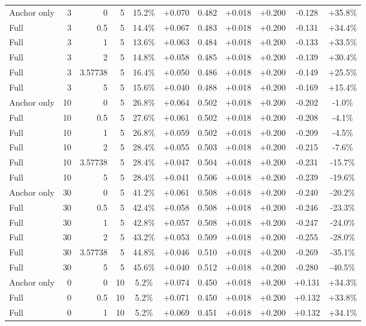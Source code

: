 \begin{table}[htbp]
\begin{tabular}{lrrrccccccc}
Anchor only & 3 & 0 & 5 & 15.2\% & +0.070 & 0.482 & +0.018 & +0.200 & -0.128 & +35.8\% \\
Full & 3 & 0.5 & 5 & 14.4\% & +0.067 & 0.483 & +0.018 & +0.200 & -0.131 & +34.4\% \\
Full & 3 & 1 & 5 & 13.6\% & +0.063 & 0.484 & +0.018 & +0.200 & -0.133 & +33.5\% \\
Full & 3 & 2 & 5 & 14.8\% & +0.058 & 0.485 & +0.018 & +0.200 & -0.139 & +30.4\% \\
Full & 3 & 3.57738 & 5 & 16.4\% & +0.050 & 0.486 & +0.018 & +0.200 & -0.149 & +25.5\% \\
Full & 3 & 5 & 5 & 15.6\% & +0.040 & 0.488 & +0.018 & +0.200 & -0.169 & +15.4\% \\
Anchor only & 10 & 0 & 5 & 26.8\% & +0.064 & 0.502 & +0.018 & +0.200 & -0.202 & -1.0\% \\
Full & 10 & 0.5 & 5 & 27.6\% & +0.061 & 0.502 & +0.018 & +0.200 & -0.208 & -4.1\% \\
Full & 10 & 1 & 5 & 26.8\% & +0.059 & 0.502 & +0.018 & +0.200 & -0.209 & -4.5\% \\
Full & 10 & 2 & 5 & 28.4\% & +0.055 & 0.503 & +0.018 & +0.200 & -0.215 & -7.6\% \\
Full & 10 & 3.57738 & 5 & 28.4\% & +0.047 & 0.504 & +0.018 & +0.200 & -0.231 & -15.7\% \\
Full & 10 & 5 & 5 & 28.4\% & +0.041 & 0.506 & +0.018 & +0.200 & -0.239 & -19.6\% \\
Anchor only & 30 & 0 & 5 & 41.2\% & +0.061 & 0.508 & +0.018 & +0.200 & -0.240 & -20.2\% \\
Full & 30 & 0.5 & 5 & 42.4\% & +0.058 & 0.508 & +0.018 & +0.200 & -0.246 & -23.3\% \\
Full & 30 & 1 & 5 & 42.8\% & +0.057 & 0.508 & +0.018 & +0.200 & -0.247 & -24.0\% \\
Full & 30 & 2 & 5 & 43.2\% & +0.053 & 0.509 & +0.018 & +0.200 & -0.255 & -28.0\% \\
Full & 30 & 3.57738 & 5 & 44.8\% & +0.046 & 0.510 & +0.018 & +0.200 & -0.269 & -35.1\% \\
Full & 30 & 5 & 5 & 45.6\% & +0.040 & 0.512 & +0.018 & +0.200 & -0.280 & -40.5\% \\
Anchor only & 0 & 0 & 10 & 5.2\% & +0.074 & 0.450 & +0.018 & +0.200 & +0.131 & +34.3\% \\
Full & 0 & 0.5 & 10 & 5.2\% & +0.071 & 0.450 & +0.018 & +0.200 & +0.132 & +33.8\% \\
Full & 0 & 1 & 10 & 5.2\% & +0.069 & 0.451 & +0.018 & +0.200 & +0.132 & +34.1\% \\

\end{tabular}
\end{table}
